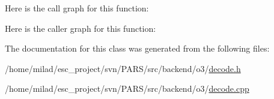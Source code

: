 Here is the call graph for this function:




Here is the caller graph for this function:




The documentation for this class was generated from the following files:\begin{DoxyCompactItemize}
\item 
/home/milad/esc\_\-project/svn/PARS/src/backend/o3/\hyperlink{o3_2decode_8h}{decode.h}\item 
/home/milad/esc\_\-project/svn/PARS/src/backend/o3/\hyperlink{o3_2decode_8cpp}{decode.cpp}\end{DoxyCompactItemize}
